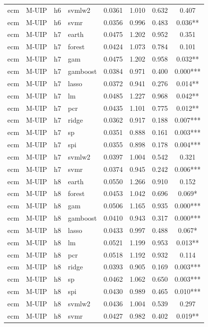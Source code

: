 \begin{ThreePartTable}
\begin{longtable}[t]{llclcccc}
ecm & M-UIP & h6 & svmlw2 & 0.0361 & 1.010 & 0.632 & 0.407\\
ecm & M-UIP & h6 & svmr & 0.0356 & 0.996 & 0.483 & 0.036**\\
\addlinespace
ecm & M-UIP & h7 & earth & 0.0475 & 1.202 & 0.952 & 0.351\\
ecm & M-UIP & h7 & forest & 0.0424 & 1.073 & 0.784 & 0.101\\
ecm & M-UIP & h7 & gam & 0.0475 & 1.202 & 0.958 & 0.032**\\
ecm & M-UIP & h7 & gamboost & 0.0384 & 0.971 & 0.400 & 0.000***\\
ecm & M-UIP & h7 & lasso & 0.0372 & 0.941 & 0.276 & 0.014**\\
ecm & M-UIP & h7 & lm & 0.0485 & 1.227 & 0.968 & 0.042**\\
ecm & M-UIP & h7 & pcr & 0.0435 & 1.101 & 0.775 & 0.012**\\
ecm & M-UIP & h7 & ridge & 0.0362 & 0.917 & 0.188 & 0.007***\\
ecm & M-UIP & h7 & sp & 0.0351 & 0.888 & 0.161 & 0.003***\\
ecm & M-UIP & h7 & spi & 0.0355 & 0.898 & 0.178 & 0.004***\\
ecm & M-UIP & h7 & svmlw2 & 0.0397 & 1.004 & 0.542 & 0.321\\
ecm & M-UIP & h7 & svmr & 0.0374 & 0.945 & 0.242 & 0.006***\\
\addlinespace
ecm & M-UIP & h8 & earth & 0.0550 & 1.266 & 0.910 & 0.152\\
ecm & M-UIP & h8 & forest & 0.0453 & 1.042 & 0.696 & 0.069*\\
ecm & M-UIP & h8 & gam & 0.0506 & 1.165 & 0.935 & 0.000***\\
ecm & M-UIP & h8 & gamboost & 0.0410 & 0.943 & 0.317 & 0.000***\\
ecm & M-UIP & h8 & lasso & 0.0433 & 0.997 & 0.488 & 0.067*\\
ecm & M-UIP & h8 & lm & 0.0521 & 1.199 & 0.953 & 0.013**\\
ecm & M-UIP & h8 & pcr & 0.0518 & 1.192 & 0.932 & 0.114\\
ecm & M-UIP & h8 & ridge & 0.0393 & 0.905 & 0.169 & 0.003***\\
ecm & M-UIP & h8 & sp & 0.0462 & 1.062 & 0.650 & 0.003***\\
ecm & M-UIP & h8 & spi & 0.0430 & 0.989 & 0.465 & 0.010***\\
ecm & M-UIP & h8 & svmlw2 & 0.0436 & 1.004 & 0.539 & 0.297\\
ecm & M-UIP & h8 & svmr & 0.0427 & 0.982 & 0.402 & 0.019**\\

\end{longtable}
\end{ThreePartTable}
